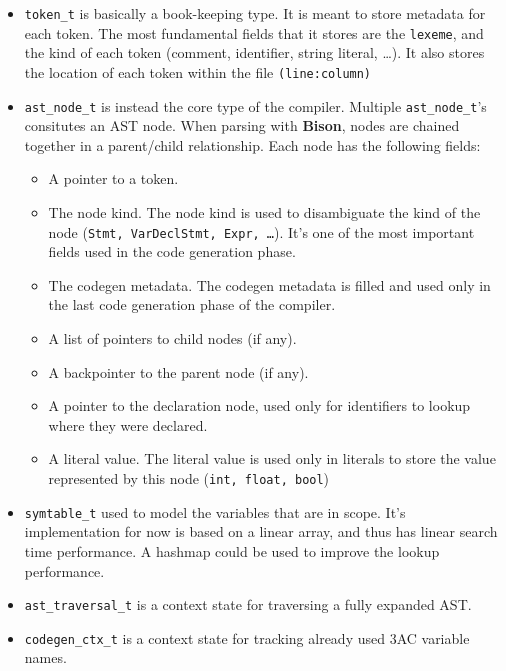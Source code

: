 \documentclass[a4paper]{article}
\begin{document}
\begin{itemize}
    \item \texttt{token\_t} is basically a book-keeping type. It is meant to store metadata for each token. The most fundamental
        fields that it stores are the \texttt{lexeme}, and the kind of each token (comment, identifier, string literal, \dots). It also stores the location of each token within the file \texttt{(line:column)}
    \item \texttt{ast\_node\_t} is instead the core type of the compiler. Multiple \texttt{ast\_node\_t}'s consitutes an AST node. When parsing
        with \textbf{Bison}, nodes are chained together in a parent/child relationship. Each node has the following fields:
        \begin{itemize}
            \item A pointer to a token.
            \item The node kind. The node kind is used to disambiguate the kind of the node (\texttt{Stmt, VarDeclStmt, Expr, \dots}). It's one of the most important fields used in the code generation phase.
            \item The codegen metadata. The codegen metadata is filled and used only in the last code generation phase of the compiler.
            \item A list of pointers to child nodes (if any).
            \item A backpointer to the parent node (if any).
            \item A pointer to the declaration node, used only for identifiers to lookup where they were declared.
            \item A literal value. The literal value is used only in literals to store the value represented by this node (\texttt{int, float, bool})
        \end{itemize}

    \item \texttt{symtable\_t} used to model the variables that are in scope. It's implementation for now is based on a linear array, and thus has linear search time performance.
        A hashmap could be used to improve the lookup performance.
    \item \texttt{ast\_traversal\_t} is a context state for traversing a fully expanded AST.
    \item \texttt{codegen\_ctx\_t} is a context state for tracking already used 3AC variable names.
\end{itemize}
\end{document}
